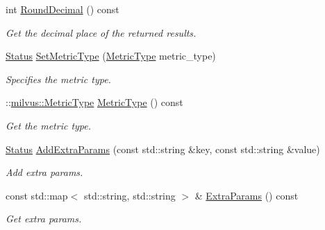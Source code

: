 \begin{DoxyCompactItemize}
\mbox{\label{classmilvus_1_1_search_arguments_a86e54279326bee6c1b2cf1c3864dc847}} 
int \hyperlink{classmilvus_1_1_search_arguments_a86e54279326bee6c1b2cf1c3864dc847}{Round\+Decimal} () const
\begin{DoxyCompactList}\small\item\em Get the decimal place of the returned results. \end{DoxyCompactList}\item 
\mbox{\label{classmilvus_1_1_search_arguments_a97daeb16c5645b0732740a8b04ab159e}} 
\hyperlink{classmilvus_1_1_status}{Status} \hyperlink{classmilvus_1_1_search_arguments_a97daeb16c5645b0732740a8b04ab159e}{Set\+Metric\+Type} (\hyperlink{namespacemilvus_a188c0c4910c0aaa1d67c0f089b55c00e}{Metric\+Type} metric\+\_\+type)
\begin{DoxyCompactList}\small\item\em Specifies the metric type. \end{DoxyCompactList}\item 
\mbox{\label{classmilvus_1_1_search_arguments_ad0bcd83cd8cd719a021d671a8bd1e696}} 
\+::\hyperlink{namespacemilvus_a188c0c4910c0aaa1d67c0f089b55c00e}{milvus\+::\+Metric\+Type} \hyperlink{classmilvus_1_1_search_arguments_ad0bcd83cd8cd719a021d671a8bd1e696}{Metric\+Type} () const
\begin{DoxyCompactList}\small\item\em Get the metric type. \end{DoxyCompactList}\item 
\mbox{\label{classmilvus_1_1_search_arguments_a3bf19cb083212dc8d6543fd1615c3585}} 
\hyperlink{classmilvus_1_1_status}{Status} \hyperlink{classmilvus_1_1_search_arguments_a3bf19cb083212dc8d6543fd1615c3585}{Add\+Extra\+Params} (const std\+::string \&key, const std\+::string \&value)
\begin{DoxyCompactList}\small\item\em Add extra params. \end{DoxyCompactList}\item 
\mbox{\label{classmilvus_1_1_search_arguments_ada4f753dfdaf9d8bb843a577f56c4660}} 
const std\+::map$<$ std\+::string, std\+::string $>$ \& \hyperlink{classmilvus_1_1_search_arguments_ada4f753dfdaf9d8bb843a577f56c4660}{Extra\+Params} () const
\begin{DoxyCompactList}\small\item\em Get extra params. \end{DoxyCompactList}\end{DoxyCompactItemize}


